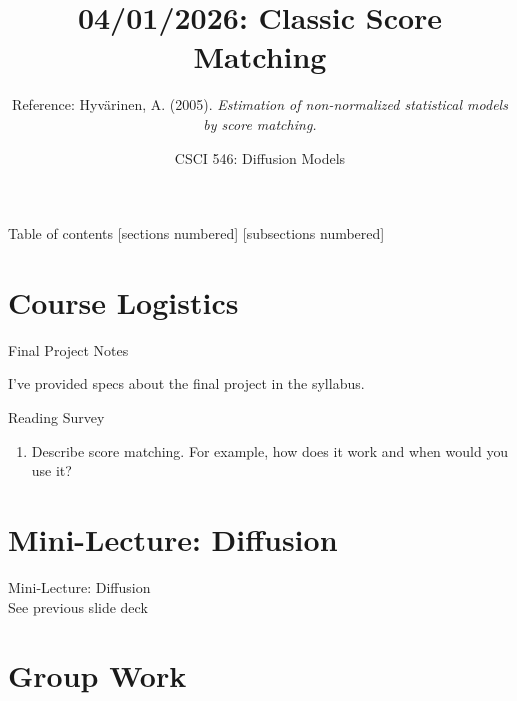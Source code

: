\documentclass[10pt]{beamer}
\title{04/01/2026: Classic Score Matching}
\author{Reference: Hyv\"arinen, A. (2005). \textit{Estimation of non-normalized statistical models by score matching.} }
\date{CSCI 546: Diffusion Models}
\begin{document}
\maketitle


\begin{frame}{Table of contents}
  [sections numbered]
  [subsections numbered]
  \tableofcontents
\end{frame}





\section{Course Logistics}



\begin{frame}{Final Project Notes}
\begin{myredbox}[title=Announcement]

I've provided specs about the final project in the syllabus.
\end{myredbox}
\end{frame}


\begin{frame}{Reading Survey}

\begin{enumerate}
	\item Describe score matching.  For example, how does it work and when would you use it?
\end{enumerate}
	
\end{frame}




\section{Mini-Lecture: Diffusion}


\begin{frame}[standout]
Mini-Lecture: Diffusion \\
See previous slide deck
\end{frame}




\section{Group Work}
\end{document}
